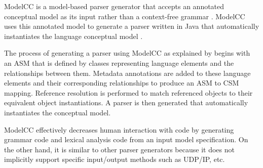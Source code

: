 \indent
ModelCC is a model-based parser generator that accepts an annotated conceptual model as its input rather than a context-free grammar \cite{quesada_01}.  ModelCC uses this annotated model to generate a parser written in Java that automatically instantiates the language conceptual model \cite{quesada_01, modelcc_01}.

\indent
The process of generating a parser using ModelCC as explained by \cite{quesada_02} begins with an ASM that is defined by classes representing language elements and the relationships between them.  Metadata annotations are added to these language elements and their corresponding relationships to produce an ASM to CSM mapping.  Reference resolution is performed to match referenced objects to their equivalent object instantiations.  A parser is then generated that automatically instantiates the conceptual model.

\indent
ModelCC effectively decreases human interaction with code by generating grammar code and lexical analysis code from an input model specification.  On the other hand, it is similar to other parser generators because it does not implicitly support specific input/output methods such as UDP/IP, etc.


